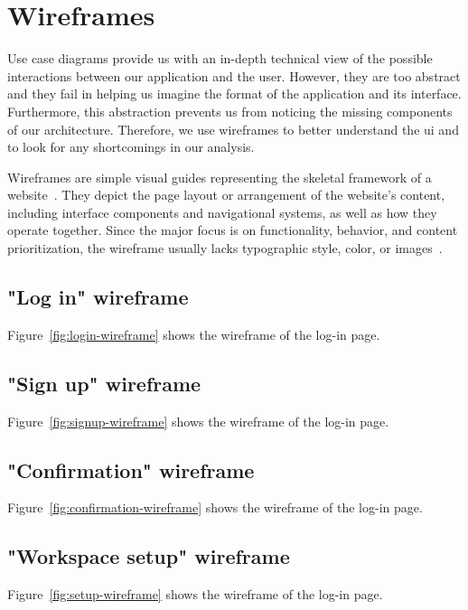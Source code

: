 \section{Wireframes}
Use case diagrams provide us with an in-depth technical view of the possible interactions between our application and the user.
However, they are too abstract and they fail in helping us imagine the format of the application and its interface.
Furthermore, this abstraction prevents us from noticing the missing components of our architecture.
Therefore, we use wireframes to better understand the \acrfull{ui} and to look for any shortcomings in our analysis.

Wireframes are simple visual guides representing the skeletal framework of a website~\autocite{gemayel_how_nodate}.
They depict the page layout or arrangement of the website's content, including interface components and navigational systems, as well as how they operate together.
Since the major focus is on functionality, behavior, and content prioritization, the wireframe usually lacks typographic style, color, or images~\autocite{garrett_elements_2011}.

\subsection{"Log in" wireframe}
Figure~\ref{fig:login-wireframe} shows the wireframe of the log-in page.


\subsection{"Sign up" wireframe}
Figure~\ref{fig:signup-wireframe} shows the wireframe of the log-in page.


\subsection{"Confirmation" wireframe}
Figure~\ref{fig:confirmation-wireframe} shows the wireframe of the log-in page.


\subsection{"Workspace setup" wireframe}
Figure~\ref{fig:setup-wireframe} shows the wireframe of the log-in page.


